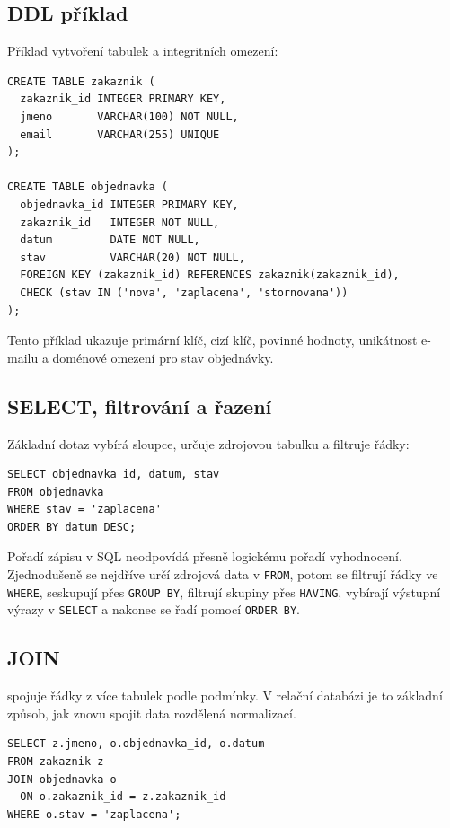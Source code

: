 \subsection{DDL příklad}
Příklad vytvoření tabulek a integritních omezení:

{\small
\begin{verbatim}
CREATE TABLE zakaznik (
  zakaznik_id INTEGER PRIMARY KEY,
  jmeno       VARCHAR(100) NOT NULL,
  email       VARCHAR(255) UNIQUE
);

CREATE TABLE objednavka (
  objednavka_id INTEGER PRIMARY KEY,
  zakaznik_id   INTEGER NOT NULL,
  datum         DATE NOT NULL,
  stav          VARCHAR(20) NOT NULL,
  FOREIGN KEY (zakaznik_id) REFERENCES zakaznik(zakaznik_id),
  CHECK (stav IN ('nova', 'zaplacena', 'stornovana'))
);
\end{verbatim}
}

Tento příklad ukazuje primární klíč, cizí klíč, povinné hodnoty, unikátnost e-mailu a doménové omezení
pro stav objednávky.

\subsection{SELECT, filtrování a řazení}
Základní dotaz vybírá sloupce, určuje zdrojovou tabulku a filtruje řádky:

{\small
\begin{verbatim}
SELECT objednavka_id, datum, stav
FROM objednavka
WHERE stav = 'zaplacena'
ORDER BY datum DESC;
\end{verbatim}
}

Pořadí zápisu v SQL neodpovídá přesně logickému pořadí vyhodnocení. Zjednodušeně se nejdříve určí
zdrojová data v \texttt{FROM}, potom se filtrují řádky ve \texttt{WHERE}, seskupují přes
\texttt{GROUP BY}, filtrují skupiny přes \texttt{HAVING}, vybírají výstupní výrazy v \texttt{SELECT}
a nakonec se řadí pomocí \texttt{ORDER BY}.

\subsection{JOIN}
 spojuje řádky z více tabulek podle podmínky. V relační databázi je to základní způsob,
jak znovu spojit data rozdělená normalizací.

{\small
\begin{verbatim}
SELECT z.jmeno, o.objednavka_id, o.datum
FROM zakaznik z
JOIN objednavka o
  ON o.zakaznik_id = z.zakaznik_id
WHERE o.stav = 'zaplacena';
\end{verbatim}
}

